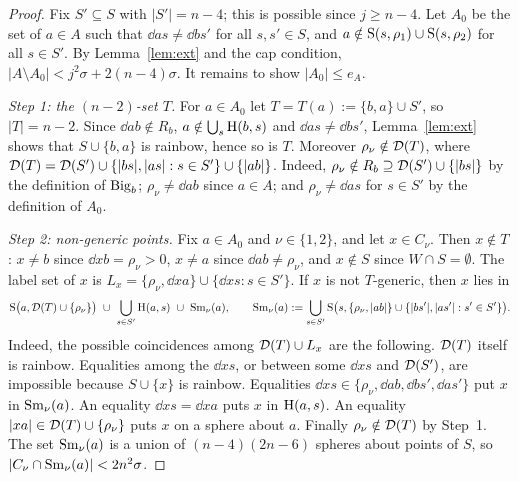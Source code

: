 \begin{proof}
Fix $S'\subseteq S$ with $|S'|=n-4$; this is possible since $j\ge n-4$. Let $A_0$ be the set of $a\in A$ such that
$\dd as\ne\dd b{s'}$ for all $s,s'\in S$, and $a\notin\mathrm{S}(s,\rho_1)\cup\mathrm{S}(s,\rho_2)$ for all $s\in S'$. By
Lemma~\ref{lem:ext} and the cap condition, $|A\setminus A_0|<j^2\sigma+2(n-4)\sigma$. It remains to show
$|A_0|\le e_A$.

\emph{Step 1: the $(n-2)$-set $T$.} For $a\in A_0$ let $T=T(a):=\{b,a\}\cup S'$, so $|T|=n-2$. Since
$\dd ab\notin R_b$, $a\notin\bigcup_s\mathrm{H}(b,s)$ and $\dd as\ne\dd b{s'}$, Lemma~\ref{lem:ext} shows that
$S\cup\{b,a\}$ is rainbow, hence so is $T$. Moreover $\rho_\nu\notin\mathcal{D}(T)$, where
$\mathcal{D}(T)=\mathcal{D}(S')\cup\{|bs|,|as|:s\in S'\}\cup\{|ab|\}$. Indeed, $\rho_\nu\notin R_b\supseteq\mathcal{D}(S')\cup\{|bs|\}$
by the definition of $\mathrm{Big}_b$; $\rho_\nu\ne\dd ab$ since $a\in A$; and $\rho_\nu\ne\dd as$ for $s\in S'$ by the
definition of $A_0$.

\emph{Step 2: non-generic points.} Fix $a\in A_0$ and $\nu\in\{1,2\}$, and let $x\in C_\nu$. Then $x\notin T$:
$x\ne b$ since $\dd xb=\rho_\nu>0$, $x\ne a$ since $\dd ab\ne\rho_\nu$, and $x\notin S$ since $W\cap S=\emptyset$.
The label set of $x$ is $L_x=\{\rho_\nu,\dd xa\}\cup\{\dd xs:s\in S'\}$. If $x$ is not $T$-generic, then $x$ lies in
\[
\Sph\bigl(a,\Dist(T)\cup\{\rho_\nu\}\bigr)\ \cup\ \bigcup_{s\in S'}\Bis(a,s)\ \cup\ \Sm_\nu(a),\qquad
\Sm_\nu(a):=\bigcup_{s\in S'}\Sph\bigl(s,\{\rho_\nu,\dd ab\}\cup\{\dd b{s'},\dd a{s'}:s'\in S'\}\bigr).
\]
Indeed, the possible coincidences among $\mathcal{D}(T)\cup L_x$ are the following. $\mathcal{D}(T)$ itself is rainbow.
Equalities among the $\dd xs$, or between some $\dd xs$ and $\mathcal{D}(S')$, are impossible because $S\cup\{x\}$ is rainbow.
Equalities $\dd xs\in\{\rho_\nu,\dd ab,\dd b{s'},\dd a{s'}\}$ put $x$ in $\mathrm{Sm}_\nu(a)$. An equality $\dd xs=\dd xa$ puts $x$
in $\mathrm{H}(a,s)$. An equality $|xa|\in\mathcal{D}(T)\cup\{\rho_\nu\}$ puts $x$ on a sphere about $a$. Finally
$\rho_\nu\notin\mathcal{D}(T)$ by Step~1. The set $\mathrm{Sm}_\nu(a)$ is a union of $(n-4)(2n-6)$ spheres about points of $S$,
so $|C_\nu\cap\mathrm{Sm}_\nu(a)|<2n^2\sigma$.


\end{proof}
